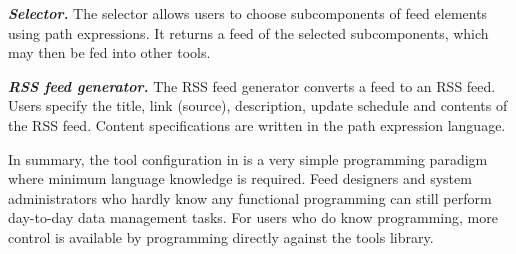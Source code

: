 \textbf{\textit{Selector.}} The selector allows users to choose
subcomponents of feed elements using path expressions. It returns a
feed of the selected subcomponents, which may then be fed into other
tools. 


\textbf{\textit{RSS feed generator.}} The RSS feed generator converts a
\padsd{} feed to an RSS feed. Users specify the title, link (source),
description, update schedule and contents of the RSS feed.  Content
specifications are written in the path expression language.



In summary, the tool configuration in \padsd{} is a very simple
programming paradigm where minimum \ocaml{} language knowledge is
required. Feed designers and system administrators who hardly know any
functional programming can still perform day-to-day data management
tasks. For users who do know \ocaml{} programming, more control is
available by programming directly against the \padsd{} tools library.

